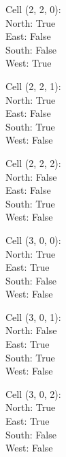 \documentclass{article}
\begin{document}
\begin{multicols*}{3}
Cell (2, 2, 0):\\
\-\hspace{2cm}North: True\\
\-\hspace{2cm}East: False\\
\-\hspace{2cm}South: False\\
\-\hspace{2cm}West: True

Cell (2, 2, 1):\\
\-\hspace{2cm}North: True\\
\-\hspace{2cm}East: False\\
\-\hspace{2cm}South: True\\
\-\hspace{2cm}West: False

Cell (2, 2, 2):\\
\-\hspace{2cm}North: False\\
\-\hspace{2cm}East: False\\
\-\hspace{2cm}South: True\\
\-\hspace{2cm}West: False

Cell (3, 0, 0):\\
\-\hspace{2cm}North: True\\
\-\hspace{2cm}East: True\\
\-\hspace{2cm}South: False\\
\-\hspace{2cm}West: False

Cell (3, 0, 1):\\
\-\hspace{2cm}North: False\\
\-\hspace{2cm}East: True\\
\-\hspace{2cm}South: True\\
\-\hspace{2cm}West: False

Cell (3, 0, 2):\\
\-\hspace{2cm}North: True\\
\-\hspace{2cm}East: True\\
\-\hspace{2cm}South: False\\
\-\hspace{2cm}West: False


\end{multicols*}
\end{document}
